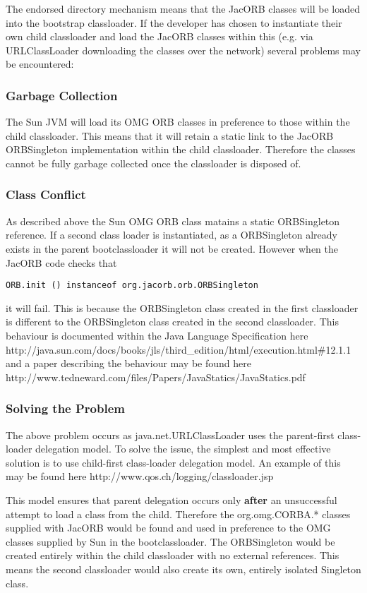 The endorsed directory mechanism means that the JacORB classes will be loaded
into the bootstrap classloader. If the developer has chosen to instantiate their
own child classloader and load the JacORB classes within this (e.g. via URLClassLoader 
downloading the classes over the network) several problems may be encountered:

\subsubsection{Garbage Collection}
The Sun JVM will load its OMG ORB classes in preference to those within the child
classloader. This means that it will retain a static link to the JacORB ORBSingleton
implementation within the child classloader. Therefore the classes cannot be fully garbage
collected once the classloader is disposed of.

\subsubsection{Class Conflict}
As described above the Sun OMG ORB class matains a static ORBSingleton reference. If a second
class loader is instantiated, as a ORBSingleton already exists in the parent bootclassloader
it will not be created. However when the JacORB code checks that

{\tt ORB.init () instanceof org.jacorb.orb.ORBSingleton }

it will fail. This is because the ORBSingleton class created in the first classloader is different
to the ORBSingleton class created in the second classloader. This behaviour is documented within the
Java Language Specification here http://java.sun.com/docs/books/jls/third\_edition/html/execution.html\#12.1.1
and a paper describing the behaviour may be found here http://www.tedneward.com/files/Papers/JavaStatics/JavaStatics.pdf


\subsubsection{Solving the Problem}
The above problem occurs as java.net.URLClassLoader uses the parent-first class-loader delegation model.
To solve the issue, the simplest and most effective solution is to use child-first class-loader delegation
model. An example of this may be found here http://www.qos.ch/logging/classloader.jsp

This model ensures that parent delegation occurs only \textbf{after} an unsuccessful attempt to load a class from
the child. Therefore the org.omg.CORBA.* classes supplied with JacORB would be found and used in preference to
the OMG classes supplied by Sun in the bootclassloader. The ORBSingleton would be created entirely within the child
classloader with no external references. This means the second classloader would also create its own, entirely 
isolated Singleton class.  
